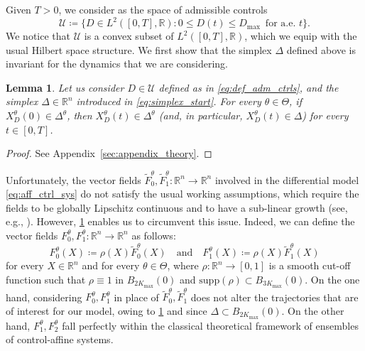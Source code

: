 \documentclass[a4paper,12pt, reqno]{amsart}
\theoremstyle{plain}
\newtheorem{lemma}[theorem]{Lemma}
\theoremstyle{definition}
\theoremstyle{remark}
\numberwithin{equation}{section}
\newcommand{\R}{\mathbb{R}}
\newcommand{\U}{\mathcal{U}}
\begin{document}
Given $T>0$, we consider as the space of admissible controls
\begin{equation}\label{eq:def_adm_ctrls}
    \U\coloneqq \{ {D} \in L^2([0,T],\R): 0\leq {D(t)\leq D_{\max} } \, \mbox{ for a.e. } t \}.
\end{equation}
We notice that $\U$ is a convex subset of $L^2([0,T],\R)$, which we equip with the usual Hilbert space structure.
We first show that the simplex $\Delta$ defined above is invariant for the dynamics that we are considering.
\begin{lemma}  \label{lem:domain_invariance}
    Let us consider ${D}\in \U$ defined as in \cref{eq:def_adm_ctrls}, and the simplex $\Delta \in \R^{n}$ introduced in \cref{eq:simplex_start}.
    For every $\theta \in \Theta$, if ${X_D^\theta(0)}\in \Delta^{\theta}$, then ${X_D^\theta(t)} \in \Delta^{\theta}$ {(and, in particular, $X_D^\theta(t) \in \Delta$)} for every $t \in [0,T]$.
\end{lemma}
\begin{proof}
    See Appendix~\ref{sec:appendix_theory}.
\end{proof}


Unfortunately, the vector fields $\tilde F_0^\theta,\tilde F_1^\theta \colon \R^{n} \to \R^{n}$ involved in the differential model \eqref{eq:aff_ctrl_sys} do not satisfy the usual working assumptions, which require the fields to be globally Lipschitz continuous and to have a sub-linear growth (see, e.g., \cite[Hypothesis~2.1]{Scag25}).
However, \cref{lem:domain_invariance} enables us to circumvent this issue. Indeed, we can define the vector fields $F_0^\theta ,F_1^\theta\colon \R^{n} \to \R^{n}$ as follows:
\begin{equation} \label{eq:def_trunc_fields}
    F_0^\theta({X}) \coloneqq \rho({X})\tilde F_0^\theta ({X}) 
    \quad \mbox{and} \quad
    F_1^\theta ({X}) \coloneqq \rho({X}) \tilde F_1^\theta ({X}) 
\end{equation}
for every ${X} \in \R^{n}$ and for every $\theta\in \Theta$, where $\rho\colon \R^{n}\to [0,1]$ is a smooth cut-off function such that $\rho\equiv 1$ in $B_{{2K_{\max}}}(0)$ and $\mathrm{supp}{(\rho)}\subset B_{{3K_{\max}}}(0)$. 
On the one hand, considering $F_0^\theta ,F_1^\theta $ in place of $\tilde F_0^\theta ,\tilde F_1^\theta$ does not alter the trajectories that are of interest for our model, owing to \cref{lem:domain_invariance} and since $\Delta \subset B_{{2K_{\max}}}(0)$. 
On the other hand, $F_1^\theta , F_2^\theta$ fall perfectly within the classical theoretical framework of ensembles of control-affine systems. 
\end{document}
